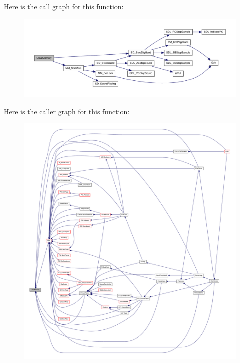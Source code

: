 Here is the call graph for this function:
\nopagebreak
\begin{figure}[H]
\begin{center}
\leavevmode
\includegraphics[width=400pt]{WL__DEF_8H_aef10ed8266c6a98e92c5d6543e7035d6_cgraph}
\end{center}
\end{figure}




Here is the caller graph for this function:
\nopagebreak
\begin{figure}[H]
\begin{center}
\leavevmode
\includegraphics[width=400pt]{WL__DEF_8H_aef10ed8266c6a98e92c5d6543e7035d6_icgraph}
\end{center}
\end{figure}


